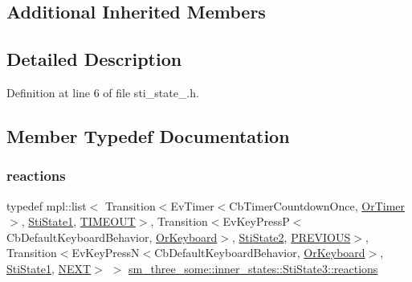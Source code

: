 \subsection*{Additional Inherited Members}


\subsection{Detailed Description}


Definition at line 6 of file sti\+\_\+state\+\_.\+h.



\subsection{Member Typedef Documentation}
\mbox{\label{structsm__three__some_1_1inner__states_1_1StiState3_a3c00d8e30a1a01b0783e9dfcf57bfd25}} 
\subsubsection{\texorpdfstring{reactions}{reactions}}
{\footnotesize\ttfamily typedef mpl\+::list$<$ Transition$<$Ev\+Timer$<$Cb\+Timer\+Countdown\+Once, \hyperlink{classsm__three__some_1_1OrTimer}{Or\+Timer}$>$, \hyperlink{structsm__three__some_1_1inner__states_1_1StiState1}{Sti\+State1}, \hyperlink{structsm__three__some_1_1inner__states_1_1StiState3_1_1TIMEOUT}{T\+I\+M\+E\+O\+UT}$>$, Transition$<$Ev\+Key\+PressP$<$Cb\+Default\+Keyboard\+Behavior, \hyperlink{classsm__three__some_1_1OrKeyboard}{Or\+Keyboard}$>$, \hyperlink{structsm__three__some_1_1inner__states_1_1StiState2}{Sti\+State2}, \hyperlink{structsm__three__some_1_1inner__states_1_1StiState3_1_1PREVIOUS}{P\+R\+E\+V\+I\+O\+US}$>$, Transition$<$Ev\+Key\+PressN$<$Cb\+Default\+Keyboard\+Behavior, \hyperlink{classsm__three__some_1_1OrKeyboard}{Or\+Keyboard}$>$, \hyperlink{structsm__three__some_1_1inner__states_1_1StiState1}{Sti\+State1}, \hyperlink{structsm__three__some_1_1inner__states_1_1StiState3_1_1NEXT}{N\+E\+XT}$>$ $>$ \hyperlink{structsm__three__some_1_1inner__states_1_1StiState3_a3c00d8e30a1a01b0783e9dfcf57bfd25}{sm\+\_\+three\+\_\+some\+::inner\+\_\+states\+::\+Sti\+State3\+::reactions}}



